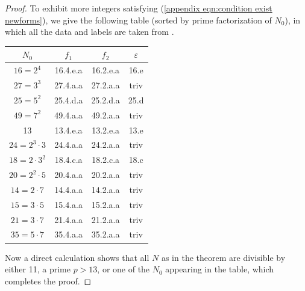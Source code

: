 \documentclass[12pt]{amsart}
\theoremstyle{definition}
\begin{document}
\begin{proof}
To exhibit more integers satisfying (\ref{appendix eqn:condition exist newforms}), we give the following table (sorted by prime factorization of $N_0$), in which all the data and labels are taken from \cite{lmfdb}.
\begin{center}
\begin{tabular}{|c|c|c|c|} 
 \hline 
 $N_0$ & $f_1$ & $f_2$ & $\varepsilon$\\
 \hline
 \hline
 $16 = 2^4$ & 16.4.e.a & 16.2.e.a & 16.e \\
$ 27 = 3^3$ & 27.4.a.a & 27.2.a.a & triv\\
 $25 = 5^2$ & 25.4.d.a & 25.2.d.a & 25.d\\
 $49 = 7^2$ & 49.4.a.a & 49.2.a.a & triv\\
  13  & 13.4.e.a & 13.2.e.a & 13.e\\
 $24 = 2^3\cdot 3$ & 24.4.a.a & 24.2.a.a & triv \\
 $18 = 2\cdot 3^2$ & 18.4.c.a & 18.2.c.a  & 18.c\\
$20 = 2^2\cdot 5$ & 20.4.a.a & 20.2.a.a & triv\\
$ 14 = 2 \cdot 7$& 14.4.a.a & 14.2.a.a & triv \\
 $15 = 3\cdot 5$ & 15.4.a.a & 15.2.a.a & triv\\
 $21= 3\cdot 7$ & 21.4.a.a & 21.2.a.a & triv \\
  $35 = 5\cdot 7$& 35.4.a.a & 35.2.a.a & triv\\
 \hline
\end{tabular}
\end{center}
Now a direct calculation shows that all $N$ as in the theorem are divisible by either 11, a prime $p > 13$, or one of the $N_0$ appearing in the table, which completes the proof. 
\end{proof}
\end{document}
